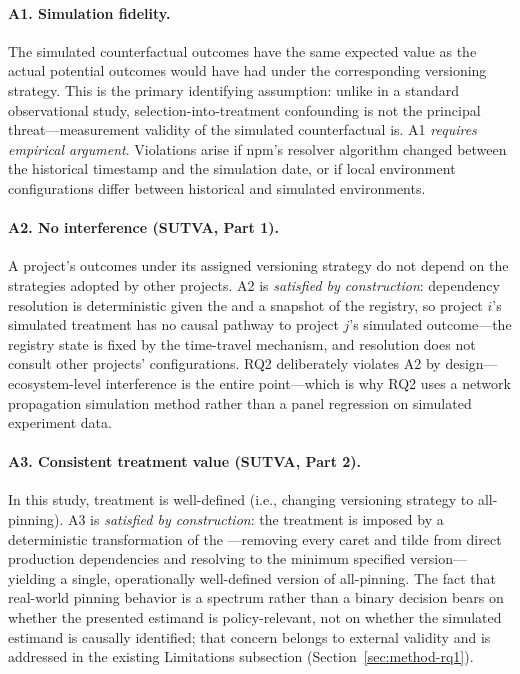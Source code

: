 \paragraph{A1. Simulation fidelity.}
The simulated counterfactual outcomes have the same expected value as the actual potential outcomes would have had under the corresponding versioning strategy.
This is the primary identifying assumption: unlike in a standard observational study, selection-into-treatment confounding is not the principal threat---measurement validity of the simulated counterfactual is.
A1 \emph{requires empirical argument}.
Violations arise if npm's resolver algorithm changed between the historical timestamp and the simulation date, or if local environment configurations differ between historical and simulated environments.

\paragraph{A2. No interference (SUTVA, Part 1).}
A project's outcomes under its assigned versioning strategy do not depend on the strategies adopted by other projects.
A2 is \emph{satisfied by construction}: dependency resolution is deterministic given the  and a snapshot of the registry, so project $i$'s simulated treatment has no causal pathway to project $j$'s simulated outcome---the registry state is fixed by the time-travel mechanism, and resolution does not consult other projects' configurations.
RQ2 deliberately violates A2 by design---ecosystem-level interference is the entire point---which is why RQ2 uses a network propagation simulation method rather than a panel regression on simulated experiment data.

\paragraph{A3. Consistent treatment value (SUTVA, Part 2).}
In this study, treatment is well-defined (i.e., changing versioning strategy to all-pinning).
A3 is \emph{satisfied by construction}: the treatment is imposed by a deterministic transformation of the ---removing every caret and tilde from direct production dependencies and resolving to the minimum specified version---yielding a single, operationally well-defined version of all-pinning.
The fact that real-world pinning behavior is a spectrum rather than a binary decision bears on whether the presented estimand is policy-relevant, not on whether the simulated estimand is causally identified; that concern belongs to external validity and is addressed in the existing Limitations subsection (Section~\ref{sec:method-rq1}).

